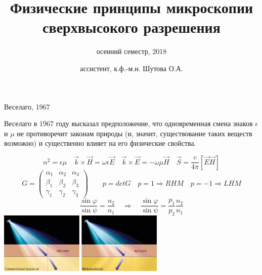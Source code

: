 \documentclass[9pt, compress, xcolor=table]{beamer}
\title{Физические принципы микроскопии сверхвысокого разрешения}
\subtitle{осенний семестр, 2018}
\author{ассистент, к.ф.-м.н. Шутова О.А.}
\institute{МГУ им. М.В. Ломоносова, физический факультет}
\begin{document}
\maketitle


\begin{frame}{Веселаго, 1967}

Веселаго в 1967 году высказал предположение, что одновременная смена знаков $\epsilon$ и $\mu$ не противоречит законам природы (и, значит, существование таких веществ
возможно) и существенно влияет на его физические свойства.
\begin{center}
\begin{equation*}
n^2 = \epsilon \mu \quad \vec k \times \vec H = \omega \epsilon \vec E\quad \vec k \times \vec E = -\omega \mu \vec H \quad \vec S = \frac{c}{4 \pi}\left[\vec E \vec H\right]
\end{equation*}
\begin{equation*}G = \begin{pmatrix} \alpha_1 & \alpha_2 & \alpha_3\\
\beta_1 & \beta_2 & \beta_3\\ \gamma_1 & \gamma_2 & \gamma_3
\end{pmatrix} \qquad p = det G\quad p=1\Rightarrow RHM \quad p= -1\Rightarrow LHM
\end{equation*}
\begin{equation*}
\frac{\sin \varphi}{\sin \psi} = \frac{n_2}{n_1}
\quad \Rightarrow \quad\frac{\sin \varphi}{\sin \psi} = \frac{p_1}{p_2}\frac{n_2}{n_1}
\end{equation*}
\includegraphics[width=0.6\textwidth]{neg_ref_1}
\end{center}

\end{frame}
\end{document}

